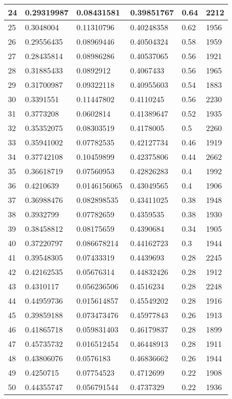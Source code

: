 \begin{longtable}{|l|l|l|l|l|l|}
24 & 0.29319987 & 0.08431581 & 0.39851767 & 0.64 & 2212 \\ \hline 
25 & 0.3048004 & 0.11310796 & 0.40248358 & 0.62 & 1956 \\ \hline 
26 & 0.29556435 & 0.08969446 & 0.40504324 & 0.58 & 1959 \\ \hline 
27 & 0.28435814 & 0.08986286 & 0.40537065 & 0.56 & 1921 \\ \hline 
28 & 0.31885433 & 0.0892912 & 0.4067433 & 0.56 & 1965 \\ \hline 
29 & 0.31700987 & 0.09322118 & 0.40955603 & 0.54 & 1883 \\ \hline 
30 & 0.3391551 & 0.11447802 & 0.4110245 & 0.56 & 2230 \\ \hline 
31 & 0.3773208 & 0.0602814 & 0.41389647 & 0.52 & 1935 \\ \hline 
32 & 0.35352075 & 0.08303519 & 0.4178005 & 0.5 & 2260 \\ \hline 
33 & 0.35941002 & 0.07782535 & 0.42127734 & 0.46 & 1919 \\ \hline 
34 & 0.37742108 & 0.10459899 & 0.42375806 & 0.44 & 2662 \\ \hline 
35 & 0.36618719 & 0.07560953 & 0.42826283 & 0.4 & 1992 \\ \hline 
36 & 0.4210639 & 0.0146156065 & 0.43049565 & 0.4 & 1906 \\ \hline 
37 & 0.36988476 & 0.082898535 & 0.43411025 & 0.38 & 1948 \\ \hline 
38 & 0.3932799 & 0.07782659 & 0.4359535 & 0.38 & 1930 \\ \hline 
39 & 0.38458812 & 0.08175659 & 0.4390684 & 0.34 & 1905 \\ \hline 
40 & 0.37220797 & 0.086678214 & 0.44162723 & 0.3 & 1944 \\ \hline 
41 & 0.39548305 & 0.07433319 & 0.4439693 & 0.28 & 2245 \\ \hline 
42 & 0.42162535 & 0.05676314 & 0.44832426 & 0.28 & 1912 \\ \hline 
43 & 0.4310117 & 0.056236506 & 0.4516234 & 0.28 & 2248 \\ \hline 
44 & 0.44959736 & 0.015614857 & 0.45549202 & 0.28 & 1916 \\ \hline 
45 & 0.39859188 & 0.073473476 & 0.45977843 & 0.26 & 1913 \\ \hline 
46 & 0.41865718 & 0.059831403 & 0.46179837 & 0.28 & 1899 \\ \hline 
47 & 0.45735732 & 0.016512454 & 0.46448913 & 0.28 & 1911 \\ \hline 
48 & 0.43806076 & 0.0576183 & 0.46836662 & 0.26 & 1944 \\ \hline 
49 & 0.4250715 & 0.07754523 & 0.4712699 & 0.22 & 1908 \\ \hline 
50 & 0.44355747 & 0.056791544 & 0.4737329 & 0.22 & 1936 \\ \hline 
\end{longtable}